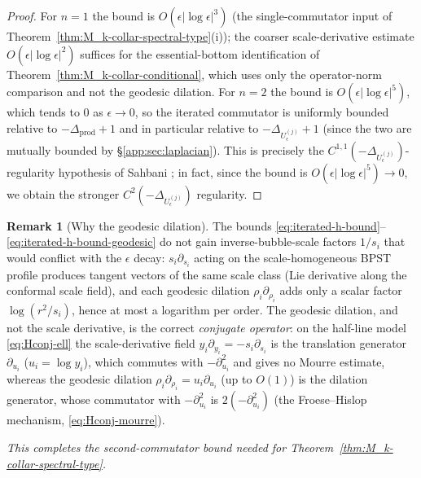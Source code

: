 \documentclass[11pt,letterpaper]{article}
\theoremstyle{definition}
\newtheorem{remark}[theorem]{Remark}
\newcommand{\Lap}{\Delta}
\begin{document}
\begin{proof}
For $n=1$ the bound is $O(\epsilon|\log\epsilon|^3)$ (the single-commutator input of Theorem~\ref{thm:M_k-collar-spectral-type}(i)); the coarser scale-derivative estimate $O(\epsilon|\log\epsilon|^2)$ suffices for the essential-bottom identification of Theorem~\ref{thm:M_k-collar-conditional}, which uses only the operator-norm comparison and not the geodesic dilation. For $n=2$ the bound is $O(\epsilon|\log\epsilon|^5)$, which tends to $0$ as $\epsilon \to 0$, so the iterated commutator is uniformly bounded relative to $-\Lap_{\mathrm{prod}}+1$ and in particular relative to $-\Lap_{U_\epsilon^{(j)}}+1$ (since the two are mutually bounded by \S\ref{app:sec:laplacian}). This is precisely the $C^{1,1}(-\Lap_{U_\epsilon^{(j)}})$-regularity hypothesis of Sahbani \cite[Hyp.~H1--H3]{Sahbani1997}; in fact, since the bound is $O(\epsilon|\log\epsilon|^5)\to 0$, we obtain the stronger $C^2(-\Lap_{U_\epsilon^{(j)}})$ regularity.
\end{proof}

\begin{remark}[Why the geodesic dilation]\label{rmk:iterated-honest}
The bounds \eqref{eq:iterated-h-bound}--\eqref{eq:iterated-h-bound-geodesic} do not gain inverse-bubble-scale factors $1/s_i$ that would conflict with the $\epsilon$ decay: $s_i\partial_{s_i}$ acting on the scale-homogeneous BPST profile produces tangent vectors of the same scale class (Lie derivative along the conformal scale field), and each geodesic dilation $\rho_i\partial_{\rho_i}$ adds only a scalar factor $\log(r^2/s_i)$, hence at most a logarithm per order. The geodesic dilation, and not the scale derivative, is the correct \emph{conjugate operator}: on the half-line model \eqref{eq:Hconj-ell} the scale-derivative field $y_i\partial_{y_i} = -s_i\partial_{s_i}$ is the translation generator $\partial_{u_i}$ ($u_i=\log y_i$), which commutes with $-\partial_{u_i}^2$ and gives no Mourre estimate, whereas the geodesic dilation $\rho_i\partial_{\rho_i} = u_i\partial_{u_i}$ (up to $O(1)$) is the dilation generator, whose commutator with $-\partial_{u_i}^2$ is $2(-\partial_{u_i}^2)$ (the Froese--Hislop mechanism, \eqref{eq:Hconj-mourre}).
\end{remark}

\medskip

\noindent\textit{This completes the second-commutator bound needed for Theorem~\ref{thm:M_k-collar-spectral-type}.}
\end{document}
